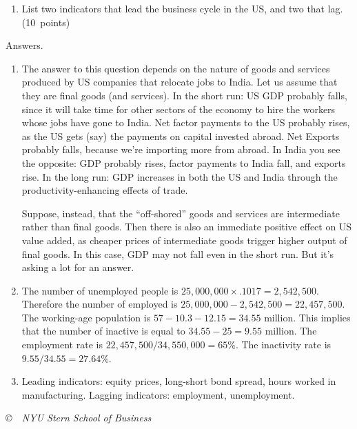 \documentclass[letterpaper,12pt]{article}
\begin{document}
\begin{enumerate}
\begin{enumerate}
\item List two indicators that lead the business cycle in the US, 
and two that lag.  
(10~points)
\end{enumerate}


Answers.
\begin{enumerate}

\item The answer to this question depends on the nature of goods
and services produced by US companies that relocate jobs to India.
Let us assume that they are final goods (and services).  In the
short run: US GDP probably falls, since it will take time for
other sectors of the economy to hire the workers whose jobs have
gone to India.  Net factor payments to the US probably rises, as
the US gets (say) the payments on capital invested abroad.  Net
Exports probably falls, because we're importing more from abroad.
In India you see the opposite:  GDP probably rises, factor
payments to India fall, and exports rise. In the long run:  GDP
increases in both the US and India through the
productivity-enhancing effects of trade.

Suppose, instead, that the ``off-shored'' goods and services are
intermediate rather than final goods.  Then there is also an
immediate positive effect on US value added, as cheaper prices of
intermediate goods trigger higher output of final goods.  In this
case, GDP may not fall even in the short run.  But it's asking a
lot for an answer.


\item The number of unemployed people is
$25,000,000\times.1017=2,542,500$. Therefore the number of
employed is $25,000,000-2,542,500=22,457,500$. The working-age
population is $57-10.3-12.15=34.55$ million. This implies that the
number of inactive is equal to $34.55-25=9.55$ million. The
employment rate is ${22,457,500}/{34,550,000}=65\%$. The
inactivity rate is ${9.55}/{34.55}=27.64\%$.

\item Leading indicators:  equity prices, long-short bond spread, 
hours worked in manufacturing.    
Lagging indicators:  employment, unemployment.  

\end{enumerate}

\end{enumerate}


\vfill \centerline{\it \copyright \ \number\year \ NYU Stern
School of Business}
\end{document}
